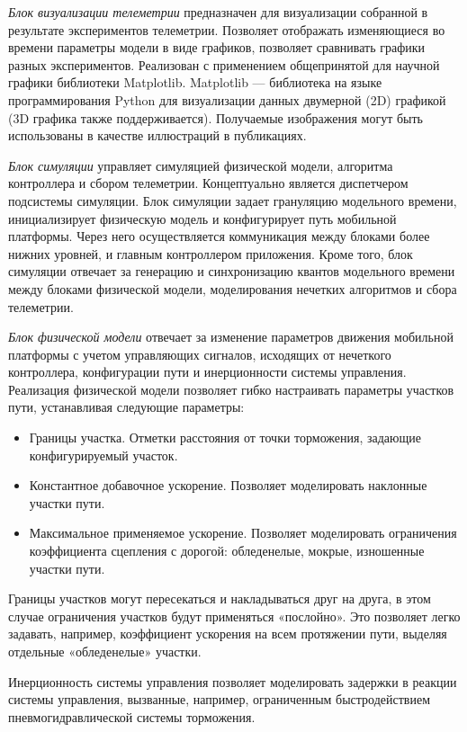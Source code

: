 \textit{Блок визуализации телеметрии} предназначен для визуализации собранной в результате экспериментов телеметрии. Позволяет отображать изменяющиеся во времени параметры модели в виде графиков, позволяет сравнивать графики разных экспериментов. Реализован с применением общепринятой для научной графики библиотеки Matplotlib. Matplotlib — библиотека на языке программирования Python для визуализации данных двумерной (2D) графикой (3D графика также поддерживается). Получаемые изображения могут быть использованы в качестве иллюстраций в публикациях.

\textit{Блок симуляции} управляет симуляцией физической модели, алгоритма контроллера и сбором телеметрии. Концептуально является диспетчером подсистемы симуляции. Блок симуляции задает грануляцию модельного времени, инициализирует физическую модель и конфигурирует путь мобильной платформы. Через него осуществляется коммуникация между блоками более нижних уровней, и главным контроллером приложения. Кроме того, блок симуляции отвечает за генерацию и синхронизацию квантов модельного времени между блоками физической модели, моделирования нечетких алгоритмов и сбора телеметрии.

\textit{Блок физической модели} отвечает за изменение параметров движения мобильной платформы с учетом управляющих сигналов, исходящих от нечеткого контроллера, конфигурации пути и инерционности системы управления. Реализация физической модели позволяет гибко настраивать параметры участков пути, устанавливая следующие параметры:

\begin{itemize}
  \item   Границы участка. Отметки расстояния от точки торможения, задающие конфигурируемый участок.
  \item   Константное добавочное ускорение. Позволяет моделировать наклонные участки пути.
  \item   Максимальное применяемое ускорение. Позволяет моделировать ограничения коэффициента сцепления с дорогой: обледенелые, мокрые, изношенные участки пути.
\end{itemize}


Границы участков могут пересекаться и накладываться друг на друга, в этом случае ограничения участков будут применяться «послойно». Это позволяет легко задавать, например, коэффициент ускорения на всем протяжении пути, выделяя отдельные «обледенелые» участки.

Инерционность системы управления позволяет моделировать задержки в реакции системы управления, вызванные, например, ограниченным быстродействием пневмогидравлической системы торможения.


